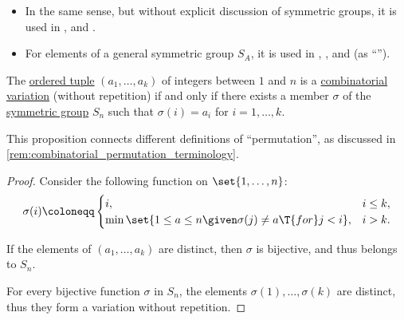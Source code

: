 \begin{remark}
\begin{itemize}
    \item In the same sense, but without explicit discussion of symmetric groups, it is used in
    \cite[28]{Knuth1997ArtVol1},
    \cite[20]{Stanley2012EnumerativeCombinatoricsVol1} and
    \cite[def. 2.11.1]{Savage2008ModelsOfComputation}.

    \item For elements of a general symmetric group \( S_A \), it is used in
    \cite[8]{Lang2002Algebra},
    \cite[116]{Rotman2015AdvancedModernAlgebraPart1},
    \cite[def. II.2.1]{Aluffi2009Algebra} and
    \cite[\S 2.2.5]{Новиков2013ДискретнаяМатематика} (as \enquote{}).
  \end{itemize}
\end{remark}

\begin{proposition}\label{thm:combinatorial_and_algebraic_permutation}
  The \hyperref[def:ordered_tuple]{ordered tuple} \( (a_1, \ldots, a_k) \) of integers between \( 1 \) and \( n \) is a \hyperref[def:combinatorial_variation]{combinatorial variation} (without repetition) if and only if there exists a member \( \sigma \) of the \hyperref[def:symmetric_group]{symmetric group} \( S_n \) such that \( \sigma(i) = a_i \) for \( i = 1, \ldots, k \).
\end{proposition}
\begin{comments}
  \item This proposition connects different definitions of \enquote{permutation}, as discussed in \cref{rem:combinatorial_permutation_terminology}.
\end{comments}
\begin{proof}
  \SufficiencySubProof Consider the following function on \( \set{ 1, \ldots, n } \):
  \begin{equation*}
    \sigma(i) \coloneqq \begin{cases}
      i,                                                                  &i \leq k, \\
      \min\set{ 1 \leq a \leq n \given \sigma(j) \neq a \T{for} j < i }, &i > k.
    \end{cases}
  \end{equation*}

  If the elements of \( (a_1, \ldots, a_k) \) are distinct, then \( \sigma \) is bijective, and thus belongs to \( S_n \).

  \NecessitySubProof For every bijective function \( \sigma \) in \( S_n \), the elements \( \sigma(1), \ldots, \sigma(k) \) are distinct, thus they form a variation without repetition.
\end{proof}

